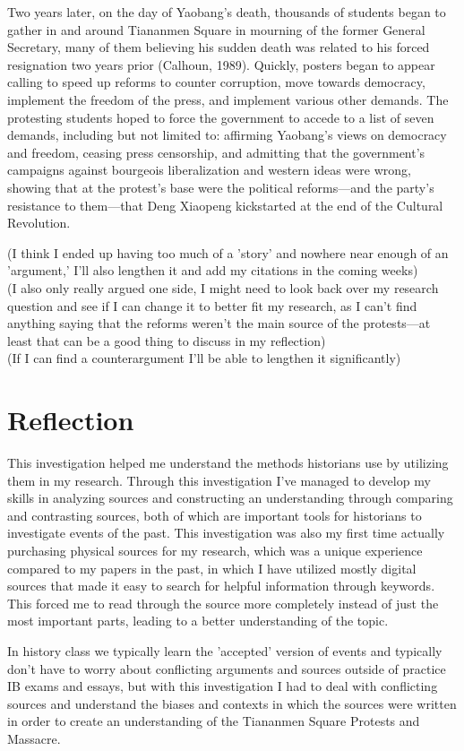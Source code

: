 \documentclass{paper}
\begin{document}
\begin{doublespace}
Two years later, on the day of Yaobang's death, thousands of students began to gather in and around Tiananmen Square in mourning of the former General Secretary, many of them believing his sudden death was related to his forced resignation two years prior (Calhoun, 1989). Quickly, posters began to appear calling to speed up reforms to counter corruption, move towards democracy, implement the freedom of the press, and implement various other demands. The protesting students hoped to force the government to accede to a list of seven demands, including but not limited to: affirming Yaobang's views on democracy and freedom, ceasing press censorship, and admitting that the government's campaigns against bourgeois liberalization and western ideas were wrong, showing that at the protest's base were the political reforms---and the party's resistance to them---that Deng Xiaopeng kickstarted at the end of the Cultural Revolution.
\end{doublespace}

(I think I ended up having too much of a 'story' and nowhere near enough of an 'argument,' I'll also lengthen it and add my citations in the coming weeks)\\
(I also only really argued one side, I might need to look back over my research question and see if I can change it to better fit my research, as I can't find anything saying that the reforms weren't the main source of the protests---at least that can be a good thing to discuss in my reflection)\\
(If I can find a counterargument I'll be able to lengthen it significantly)\\
\newpage

\section{Reflection}
\begin{doublespace}
This investigation helped me understand the methods historians use by utilizing them in my research. Through this investigation I've managed to develop my skills in analyzing sources and constructing an understanding through comparing and contrasting sources, both of which are important tools for historians to investigate events of the past. This investigation was also my first time actually purchasing physical sources for my research, which was a unique experience compared to my papers in the past, in which I have utilized mostly digital sources that made it easy to search for helpful information through keywords. This forced me to read through the source more completely instead of just the most important parts, leading to a better understanding of the topic.

In history class we typically learn the 'accepted' version of events and typically don't have to worry about conflicting arguments and sources outside of practice IB exams and essays, but with this investigation I had to deal with conflicting sources and understand the biases and contexts in which the sources were written in order to create an understanding of the Tiananmen Square Protests and Massacre.
\end{doublespace}
\end{document}
